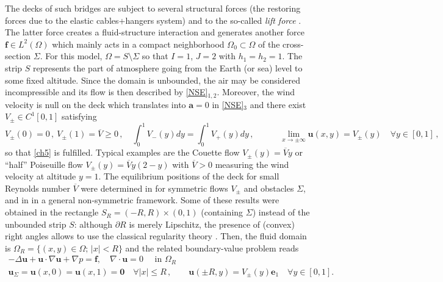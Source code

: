 \documentclass[11pt]{article}
\numberwithin{equation}{section}
\numberwithin{figure}{section}
\def\ue{{\mathbf u}}
\def\fe{{\mathbf f}}
\def\0{{\mathbf 0}}
\def\aa{{\mathbf a}}
\def\ee{{\mathbf e}}
\def\fe{{\mathbf f}}
\begin{document}
The decks of such bridges are subject to several structural forces (the restoring forces due to the elastic cables+hangers system) and to
the so-called {\it lift force} \cite{langre}. The latter force creates a fluid-structure interaction and generates another force
$\fe\in L^2(\Omega)$ which mainly acts in a compact neighborhood $\Omega_0\subset\Omega$ of the cross-section $\Sigma$.
For this model, $\Omega=S\setminus\Sigma$ so that $I=1$, $J=2$ with $h_1=h_2=1$.
The strip $S$ represents the part of atmosphere going from the Earth (or sea) level to some fixed altitude.
Since the domain is unbounded, the air may be considered incompressible and its flow is then described by \eqref{NSE}$_{1,2}$.
Moreover, the wind velocity is null on the deck which translates into $\aa=0$ in \eqref{NSE}$_3$ and there
exist $V_\pm\in C^1[0,1]$ satisfying
$$
V_\pm(0)=0\, ,\ V_\pm(1)=\overline{V}\ge0\, ,\quad\int_0^1 V_-(y)dy=\int_0^1 V_+(y) dy\, ,\qquad
\quad \lim_{x\to\pm\infty}\ue (x,y)=V_\pm(y)\quad\forall y\in[0,1]\, ,
$$
so that \eqref{ch5} is fulfilled. Typical examples are the Couette flow $V_\pm(y)=\overline{V}y$ or ``half''
Poiseuille flow $V_\pm(y)=\overline{V}y(2-y)$ with $\overline{V}>0$ measuring the wind velocity at altitude $y=1$.
The equilibrium positions of the deck for small Reynolds number $\overline{V}$ were determined in \cite{berchio2024equilibrium,gazspe,gazzola2022connection}
for symmetric flows $V_\pm$ and obstacles $\Sigma$, and in \cite{edofil,bocchi2024measure} in a general non-symmetric framework. Some of these results
were obtained in the rectangle $S_R=(-R,R)\times(0,1)$ (containing $\Sigma$) instead of the unbounded strip $S$: although $\partial R$ is
merely Lipschitz, the presence of (convex) right angles allows to use the classical regularity theory \cite{kellogg1976regularity}.
Then, the fluid domain is $\Omega_R=\{(x,y)\in\Omega;\, |x|<R\}$ and the related boundary-value problem reads
\begin{equation}\label{BVprobR}
	\begin{array}{cc}
		-\Delta \ue +\ue \cdot\nabla \ue +\nabla p=\fe,\quad\nabla\cdot \ue =0\quad\mbox{ in }\Omega_R\\
		\ue _{\Sigma}=\ue (x,0)=\ue (x,1)=\0\quad\forall|x|\le R\, ,\qquad \ue (\pm R,y)=V_\pm(y)\ee_1\quad\forall y\in[0,1].
	\end{array}
\end{equation}
\end{document}
